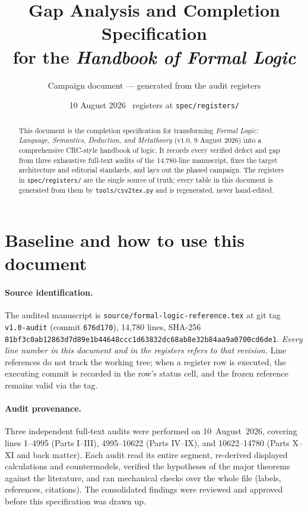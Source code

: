 \documentclass[11pt,letterpaper]{article}
\title{\bfseries Gap Analysis and Completion Specification\\
\Large for the \emph{Handbook of Formal Logic}}
\author{Campaign document --- generated from the audit registers}
\date{10 August 2026 \textperiodcentered\ registers at \texttt{spec/registers/}}
\begin{document}
\maketitle

\begin{abstract}
\noindent
This document is the completion specification for transforming
\emph{Formal Logic: Language, Semantics, Deduction, and Metatheory}
(v1.0, 9 August 2026) into a comprehensive CRC-style handbook of logic.
It records every verified defect and gap from three exhaustive full-text
audits of the 14{,}780-line manuscript, fixes the target architecture and
editorial standards, and lays out the phased campaign.  The registers in
\texttt{spec/registers/} are the single source of truth; every table in
this document is generated from them by \texttt{tools/csv2tex.py} and is
regenerated, never hand-edited.
\end{abstract}

\tableofcontents

\section{Baseline and how to use this document}
\label{sec:baseline}

\paragraph{Source identification.}
The audited manuscript is
\texttt{source/formal-logic-reference.tex} at git tag
\texttt{v1.0-audit} (commit \texttt{676d170}), 14{,}780 lines,
SHA-256
\texttt{81bf3c0a\-b12863d7\-d89e1b44\-648ccc1d\-63832dc6\-8ab8e32b\-84aa9a07\-00cd6de1}.
\emph{Every line number in this document and in the registers refers to
that revision.}  Line references do not track the working tree; when a
register row is executed, the executing commit is recorded in the row's
status cell, and the frozen reference remains valid via the tag.

\paragraph{Audit provenance.}
Three independent full-text audits were performed on 10~August~2026,
covering lines 1--4995 (Parts I--III), 4995--10622 (Parts IV--IX), and
10622--14780 (Parts X--XI and back matter).  Each audit read its entire
segment, re-derived displayed calculations and countermodels, verified
the hypotheses of the major theorems against the literature, and ran
mechanical checks over the whole file (labels, references, citations).
The consolidated findings were reviewed and approved before this
specification was drawn up.
\end{document}
